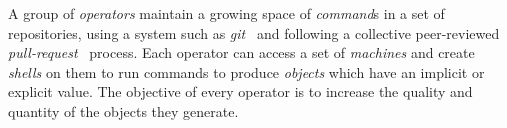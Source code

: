 A group of \emph{operators} maintain a growing space of \emph{command}s in a set of repositories, using a system such as \emph{git}~\cite{git} and following a collective peer-reviewed \emph{pull-request}~\cite{pull_request} process. Each operator can access a set of \emph{machines} and create \emph{shells} on them to run commands to produce \emph{objects} which have an implicit or explicit value. The objective of every operator is to increase the quality and quantity of the objects they generate.
